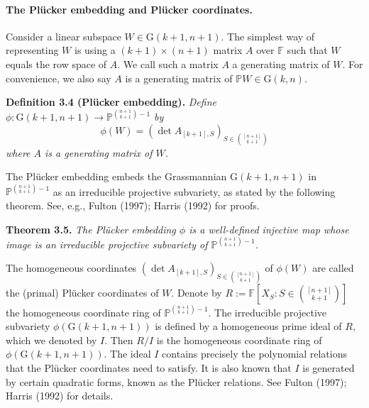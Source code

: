 \documentclass[10pt,a4paper]{article}
\newcommand{\FF}{\mathbb F}
\newcommand{\PP}{\mathbb P}
\newcommand{\GG}{\mathrm G}
\newenvironment{result}[1]{\par\medskip\noindent\textbf{#1.}\itshape}{\par\medskip}
\begin{document}
\paragraph{The Pl\"ucker embedding and Pl\"ucker coordinates.}
Consider a linear subspace $W\in\GG(k+1,n+1)$. The simplest way of representing $W$ is using a $(k+1)\times(n+1)$ matrix $A$ over $\FF$ such that $W$ equals the row space of $A$. We call such a matrix $A$ a generating matrix of $W$. For convenience, we also say $A$ is a generating matrix of $\PP W\in\GG(k,n)$.
\begin{result}{Definition 3.4 (Pl\"ucker embedding)}
Define $\phi:\GG(k+1,n+1)\to\PP^{\binom{n+1}{k+1}-1}$ by
\[\phi(W)=(\det A_{[k+1],S})_{S\in\binom{[n+1]}{k+1}}\]
where $A$ is a generating matrix of $W$.
\end{result}
The Pl\"ucker embedding embeds the Grassmannian $\GG(k+1,n+1)$ in $\PP^{\binom{n+1}{k+1}-1}$ as an irreducible projective subvariety, as stated by the following theorem. See, e.g., Fulton (1997); Harris (1992) for proofs.
\begin{result}{Theorem 3.5}
The Pl\"ucker embedding $\phi$ is a well-defined injective map whose image is an irreducible projective subvariety of $\PP^{\binom{n+1}{k+1}-1}$.
\end{result}
The homogeneous coordinates $(\det A_{[k+1],S})_{S\in\binom{[n+1]}{k+1}}$ of $\phi(W)$ are called the (primal) Pl\"ucker coordinates of $W$.
Denote by $R:=\FF[X_S:S\in\binom{[n+1]}{k+1}]$ the homogeneous coordinate ring of $\PP^{\binom{n+1}{k+1}-1}$. The irreducible projective subvariety $\phi(\GG(k+1,n+1))$ is defined by a homogeneous prime ideal of $R$, which we denoted by $I$. Then $R/I$ is the homogeneous coordinate ring of $\phi(\GG(k+1,n+1))$. The ideal $I$ contains precisely the polynomial relations that the Pl\"ucker coordinates need to satisfy. It is also known that $I$ is generated by certain quadratic forms, known as the Pl\"ucker relations. See Fulton (1997); Harris (1992) for details.
\end{document}
